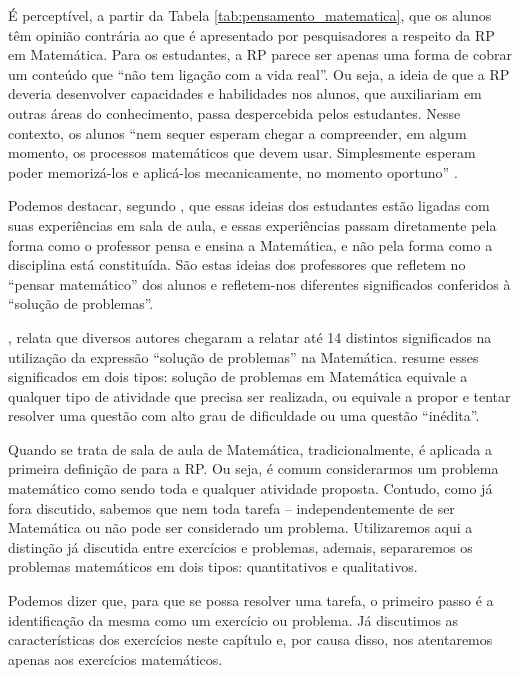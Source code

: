 É perceptível, a partir da Tabela \ref{tab:pensamento_matematica}, que os alunos têm opinião contrária ao que é apresentado por pesquisadores a respeito da RP em Matemática. Para os estudantes, a RP parece ser apenas uma forma de cobrar um conteúdo que “não tem ligação com a vida real”. Ou seja, a ideia de que a RP deveria desenvolver capacidades e habilidades nos alunos, que auxiliariam em outras áreas do conhecimento, passa despercebida pelos estudantes. Nesse contexto, os alunos “nem sequer esperam chegar a compreender, em algum momento, os processos matemáticos que devem usar. Simplesmente esperam poder memorizá-los e aplicá-los mecanicamente, no momento oportuno” \cite{Echeverria1998}. 

Podemos destacar, segundo , que essas ideias dos estudantes estão ligadas com suas experiências em sala de aula, e essas experiências passam diretamente pela forma como o professor pensa e ensina a Matemática, e não pela forma como a disciplina está constituída. São estas ideias dos professores que refletem no “pensar matemático” dos alunos e refletem-nos diferentes significados conferidos à “solução de problemas”. 

, relata que diversos autores chegaram a relatar até 14 distintos significados na utilização da expressão “solução de problemas” na Matemática.  resume esses significados em dois tipos: solução de problemas em Matemática equivale a qualquer tipo de atividade que precisa ser realizada, ou equivale a propor e tentar resolver uma questão com alto grau de dificuldade ou uma questão “inédita”. 

Quando se trata de sala de aula de Matemática, tradicionalmente, é aplicada a primeira definição de  para a RP. Ou seja, é comum considerarmos um problema matemático como sendo toda e qualquer atividade proposta. Contudo, como já fora discutido, sabemos que nem toda tarefa – independentemente de ser Matemática ou não pode ser considerado um problema. Utilizaremos aqui a distinção já discutida entre exercícios e problemas, ademais, separaremos os problemas matemáticos em dois tipos: quantitativos e qualitativos. 

Podemos dizer que, para que se possa resolver uma tarefa, o primeiro passo é a identificação da mesma como um exercício ou problema. Já discutimos as características dos exercícios neste capítulo e, por causa disso, nos atentaremos apenas aos exercícios matemáticos. 

